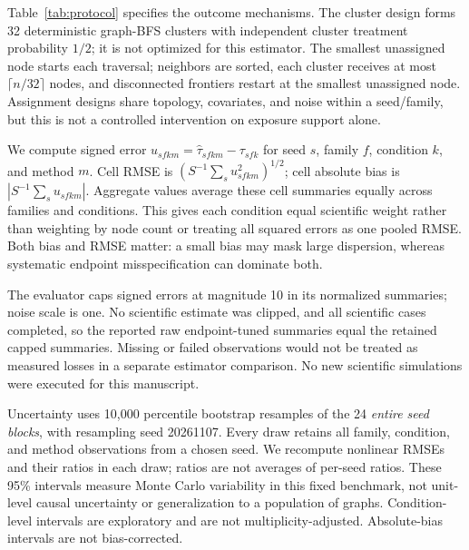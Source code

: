 \documentclass{article}
\newcommand{\gate}{\tau}
\begin{document}
Table~\ref{tab:protocol} specifies the outcome mechanisms. The cluster design forms 32 deterministic graph-BFS clusters with independent cluster treatment probability $1/2$; it is not optimized for this estimator. The smallest unassigned node starts each traversal; neighbors are sorted, each cluster receives at most $\lceil n/32\rceil$ nodes, and disconnected frontiers restart at the smallest unassigned node. Assignment designs share topology, covariates, and noise within a seed/family, but this is not a controlled intervention on exposure support alone.

We compute signed error $u_{sfkm}=\widehat\gate_{sfkm}-\gate_{sfk}$ for seed $s$, family $f$, condition $k$, and method $m$. Cell RMSE is $(S^{-1}\sum_s u_{sfkm}^2)^{1/2}$; cell absolute bias is $|S^{-1}\sum_s u_{sfkm}|$. Aggregate values average these cell summaries equally across families and conditions. This gives each condition equal scientific weight rather than weighting by node count or treating all squared errors as one pooled RMSE. Both bias and RMSE matter: a small bias may mask large dispersion, whereas systematic endpoint misspecification can dominate both.

The evaluator caps signed errors at magnitude 10 in its normalized summaries; noise scale is one. No scientific estimate was clipped, and all scientific cases completed, so the reported raw endpoint-tuned summaries equal the retained capped summaries. Missing or failed observations would not be treated as measured losses in a separate estimator comparison. No new scientific simulations were executed for this manuscript.

Uncertainty uses 10,000 percentile bootstrap resamples of the 24 \emph{entire seed blocks}, with resampling seed 20261107. Every draw retains all family, condition, and method observations from a chosen seed. We recompute nonlinear RMSEs and their ratios in each draw; ratios are not averages of per-seed ratios. These 95\% intervals measure Monte Carlo variability in this fixed benchmark, not unit-level causal uncertainty or generalization to a population of graphs. Condition-level intervals are exploratory and are not multiplicity-adjusted. Absolute-bias intervals are not bias-corrected.
\end{document}
